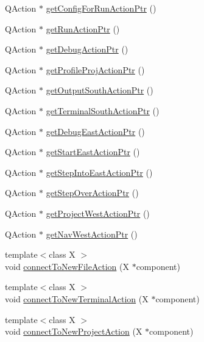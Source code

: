 \begin{DoxyCompactItemize}
\item 
Q\-Action $\ast$ \hyperlink{class_master_actions_a5266af068fe6ec921cca9e84b9ad7c13}{get\-Config\-For\-Run\-Action\-Ptr} ()
\item 
Q\-Action $\ast$ \hyperlink{class_master_actions_a99017fd6ad87557fb0dbbf60ced23a23}{get\-Run\-Action\-Ptr} ()
\item 
Q\-Action $\ast$ \hyperlink{class_master_actions_a38c19285a782f80fd538243f1a7119bc}{get\-Debug\-Action\-Ptr} ()
\item 
Q\-Action $\ast$ \hyperlink{class_master_actions_ac14ba2c15188efd85f5dd52fcbe138fc}{get\-Profile\-Proj\-Action\-Ptr} ()
\item 
Q\-Action $\ast$ \hyperlink{class_master_actions_acb9a1d3eb98cab06fd2ae5b9faf30fc3}{get\-Output\-South\-Action\-Ptr} ()
\item 
Q\-Action $\ast$ \hyperlink{class_master_actions_ae9a9fe05579b18051c29f7e54d50a06b}{get\-Terminal\-South\-Action\-Ptr} ()
\item 
Q\-Action $\ast$ \hyperlink{class_master_actions_ab0bf5679a95bb077993d8461de4ae1e5}{get\-Debug\-East\-Action\-Ptr} ()
\item 
Q\-Action $\ast$ \hyperlink{class_master_actions_a7f0344eed03af4f55f63f8ec7bf8e22c}{get\-Start\-East\-Action\-Ptr} ()
\item 
Q\-Action $\ast$ \hyperlink{class_master_actions_a952ffb933b8f8e1c8378eaea85ebe9ad}{get\-Step\-Into\-East\-Action\-Ptr} ()
\item 
Q\-Action $\ast$ \hyperlink{class_master_actions_aa042cf65b6c9ab5f056c829ca76de95d}{get\-Step\-Over\-Action\-Ptr} ()
\item 
Q\-Action $\ast$ \hyperlink{class_master_actions_a97e9c1a3bd46f70d1afd640ac06cc18d}{get\-Project\-West\-Action\-Ptr} ()
\item 
Q\-Action $\ast$ \hyperlink{class_master_actions_af34890304ed29b9a0def25b5c3bbe1f3}{get\-Nav\-West\-Action\-Ptr} ()
\item 
{\footnotesize template$<$class X $>$ }\\void \hyperlink{class_master_actions_a24f67a69e013feac51a24a34d32f2c40}{connect\-To\-New\-File\-Action} (X $\ast$component)
\item 
{\footnotesize template$<$class X $>$ }\\void \hyperlink{class_master_actions_aeca9ddb448704bcc3a7e9ac3a66d5b57}{connect\-To\-New\-Terminal\-Action} (X $\ast$component)
\item 
{\footnotesize template$<$class X $>$ }\\void \hyperlink{class_master_actions_a7eb69b0a616b949086f7422394f6c881}{connect\-To\-New\-Project\-Action} (X $\ast$component)

\end{DoxyCompactItemize}
